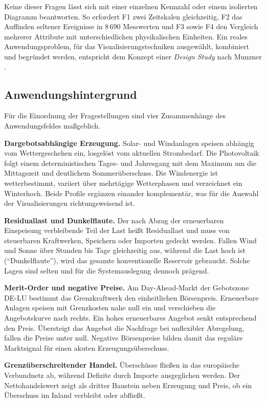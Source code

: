 Keine dieser Fragen lässt sich mit einer einzelnen Kennzahl oder einem isolierten Diagramm
beantworten. So erfordert F1 zwei Zeitskalen gleichzeitig, F2 das Auffinden seltener Ereignisse in
$8\,690$ Messwerten und F3 sowie F4 den Vergleich mehrerer Attribute mit unterschiedlichen physikalischen
Einheiten. Ein reales Anwendungsproblem, für das Visualisierungstechniken ausgewählt, kombiniert und
begründet werden, entspricht dem Konzept einer \emph{Design Study} nach Munzner \cite{Munzner2008}.

\subsection{Anwendungshintergrund}

Für die Einordnung der Fragestellungen sind vier Zusammenhänge des Anwendungsfeldes maßgeblich.

\textbf{Dargebotsabhängige Erzeugung.} Solar- und Windanlagen speisen abhängig vom Wettergeschehen
ein, losgelöst vom aktuellen Strombedarf. Die Photovoltaik folgt einem deterministischen Tages- und
Jahresgang mit dem Maximum um die Mittagszeit und deutlichem Sommerüberschuss. Die Windenergie ist
wetterbestimmt, variiert über mehrtägige Wetterphasen und verzeichnet ein Winterhoch. Beide Profile
ergänzen einander komplementär, was für die Auswahl der Visualisierungen richtungsweisend ist.

\textbf{Residuallast und Dunkelflaute.} Der nach Abzug der erneuerbaren Einspeisung verbleibende Teil
der Last heißt Residuallast und muss von steuerbaren Kraftwerken, Speichern oder Importen gedeckt
werden. Fallen Wind und Sonne über Stunden bis Tage gleichzeitig aus, während die Last hoch ist
(\enquote{Dunkelflaute}), wird das gesamte konventionelle Reservoir gebraucht. Solche Lagen sind
selten und für die Systemauslegung dennoch prägend.

\textbf{Merit-Order und negative Preise.} Am Day-Ahead-Markt der Gebotszone DE-LU bestimmt das
Grenzkraftwerk den einheitlichen Börsenpreis. Erneuerbare Anlagen speisen mit Grenzkosten nahe null
ein und verschieben die Angebotskurve nach rechts. Ein hohes erneuerbares Angebot senkt entsprechend
den Preis. Übersteigt das Angebot die Nachfrage bei unflexibler Abregelung, fallen die Preise unter
null. Negative Börsenpreise bilden damit das reguläre Marktsignal für einen akuten Erzeugungsüberschuss.

\textbf{Grenzüberschreitender Handel.} Überschüsse fließen in das europäische Verbundnetz ab,
während Defizite durch Importe ausgeglichen werden. Der Nettohandelswert zeigt als dritter Baustein
neben Erzeugung und Preis, ob ein Überschuss im Inland verbleibt oder abfließt.


